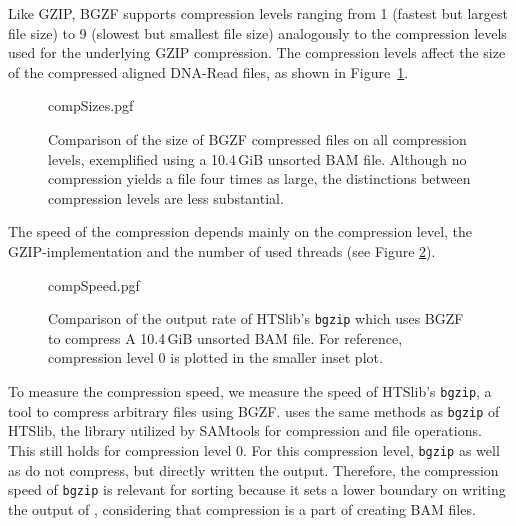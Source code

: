 Like GZIP, BGZF supports compression levels ranging from 1 (fastest but largest file size) to 9 (slowest but smallest file size) analogously to the compression levels used for the underlying GZIP compression. The compression levels affect the size of the compressed aligned DNA-Read files, as shown in Figure~\ref{fig:compSizes}.
\begin{figure}[htb]
        {compSizes.pgf}
    \caption{Comparison of the size of BGZF compressed files on all compression levels, exemplified using a 10.4\,GiB unsorted BAM file. 
    Although no compression yields a file four times as large, the distinctions between compression levels are less substantial.}
    \label{fig:compSizes}
\end{figure}
The speed of the compression depends mainly on the compression level, the GZIP-implementation and the number of used threads (see Figure \ref{fig:compSpeed}).  
\begin{figure}[htb]
        {compSpeed.pgf}
    \caption{Comparison of the output rate of HTSlib's \texttt{bgzip} which uses BGZF to compress A 10.4\,GiB unsorted BAM file. For reference, compression level 0 is plotted in the smaller inset plot.}
    \label{fig:compSpeed}
\end{figure}
To measure the compression speed, we measure the speed of HTSlib's \texttt{bgzip}, a tool to compress arbitrary files using BGZF. \sort uses the same methods as \texttt{bgzip} of HTSlib, the library utilized by SAMtools for compression and file operations. This still holds for compression level 0. For this compression level, \texttt{bgzip} as well as \sort do not compress, but directly written the output. Therefore, the compression speed of \texttt{bgzip} is relevant for sorting because it sets a lower boundary on writing the output of \sort, considering that compression is a part of creating BAM files.
